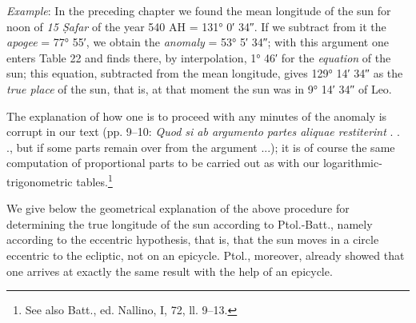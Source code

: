 \documentclass[11pt]{article}
\newcommand{\Pg}[1]{\marginpar{\footnotesize\color{gray}#1}}
\begin{document}
\par \emph{Example}: In the preceding chapter we found the mean longitude of the sun for noon of \emph{15 Ṣafar} of the year 540 AH = 131° 0′ 34″. If we subtract from it the \Pg{44}\emph{apogee} = 77° 55′, we obtain the \emph{anomaly} = 53° 5′ 34″; with this argument one enters Table 22 and finds there, by interpolation, 1° 46′ for the \emph{equation} of the sun; this equation, subtracted from the mean longitude, gives 129° 14′ 34″ as the \emph{true place} of the sun, that is, at that moment the sun was in 9° 14′ 34″ of Leo.\par
\par The explanation of how one is to proceed with any minutes of the anomaly is corrupt in our text (pp. 9–10: \emph{Quod si ab argumento partes aliquae restiterint} . . ., but if some parts remain over from the argument ...); it is of course the same computation of proportional parts to be carried out as with our logarithmic-trigonometric tables.\footnote{See also Batt., ed. Nallino, I, 72, ll. 9–13.}\par
\par We give below the geometrical explanation of the above procedure for determining the true longitude of the sun according to Ptol.-Batt., namely according to the eccentric hypothesis, that is, that the sun moves in a circle eccentric to the ecliptic, not on an epicycle. Ptol., moreover, already showed that one arrives at exactly the same result with the help of an epicycle.\par
\end{document}
